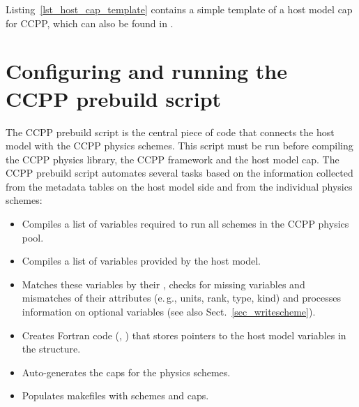 Listing~\ref{lst_host_cap_template} contains a simple template of a host model cap for CCPP, which can also be found in .
\begin{figure}

\end{figure}

\section{Configuring and running the CCPP prebuild script}
\label{sec_ccpp_prebuild_config}
The CCPP prebuild script  is the central piece of code that connects the host model with the CCPP physics schemes. This script must be run before compiling the CCPP physics library, the CCPP framework and the host model cap. The CCPP prebuild script automates several tasks based on the information collected from the metadata tables on the host model side and from the individual physics schemes:
\begin{itemize}
\item Compiles a list of variables required to run all schemes in the CCPP physics pool.
\item Compiles a list of variables provided by the host model.
\item Matches these variables by their , checks for missing variables and mismatches of their attributes (e.\,g., units, rank, type, kind) and processes information on optional variables (see also Sect.~\ref{sec_writescheme}).
\item Creates Fortran code (, ) that stores pointers to the host model variables in the  structure.
\item Auto-generates the caps for the physics schemes.
\item Populates makefiles with schemes and caps.
\end{itemize}

